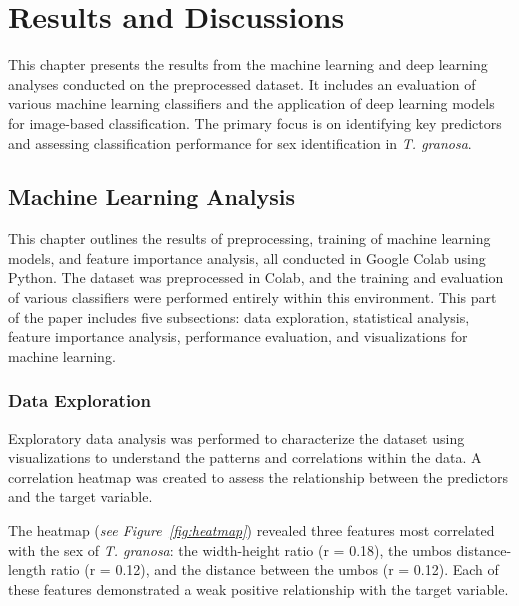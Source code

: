 
\chapter{Results and Discussions}
This chapter presents the results from the machine learning and deep learning analyses conducted on the preprocessed dataset. It includes an evaluation of various machine learning classifiers and the application of deep learning models for image-based classification. The primary focus is on identifying key predictors and assessing classification performance for sex identification in \textit{T. granosa}.

\section{Machine Learning Analysis}

This chapter outlines the results of preprocessing, training of machine learning models, and feature importance analysis, all conducted in Google Colab using Python. The dataset was preprocessed in Colab, and the training and evaluation of various classifiers were performed entirely within this environment.  This part of the paper includes five subsections: data exploration, statistical analysis, feature importance analysis, performance evaluation, and visualizations for machine learning.

\subsection{Data Exploration}

Exploratory data analysis was performed to characterize the dataset using visualizations to understand the patterns and correlations within the data. A correlation heatmap was created to assess the relationship between the predictors and the target variable.

The heatmap (\textit{see Figure~\ref{fig:heatmap}}) revealed three features most correlated with the sex of \textit{T. granosa}: the width-height ratio (r = 0.18), the umbos distance-length ratio (r = 0.12), and the distance between the umbos (r = 0.12). Each of these features demonstrated a weak positive relationship with the target variable. 

